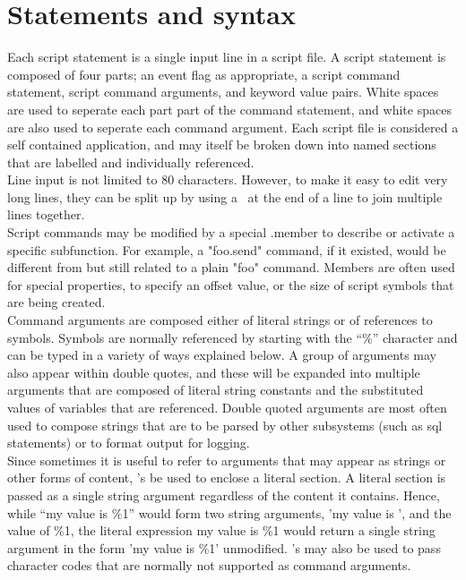 \documentclass[a4paper,12pt]{article}
\begin{document}
\section{Statements and syntax}

Each script statement is a single input line in a script file.  A script
statement is composed of four parts; an event flag as appropriate, a
script command statement, script command arguments, and keyword value
pairs.  White spaces are used to seperate each part part of the command
statement, and white spaces are also used to seperate each command
argument. Each script file is considered a self contained application, 
and may itself be broken down into named sections that are labelled and 
individually referenced. \\

Line input is not limited to 80 characters.  However, to make it easy to 
edit very long lines, they can be split up by using a \ at the end of a 
line to join multiple lines together. \\

Script commands may be modified by a special .member to describe or
activate a specific subfunction.  For example, a "foo.send" command, if it
existed, would be different from but still related to a plain "foo"  
command.  Members are often used for special properties, to specify an
offset value, or the size of script symbols that are being created. \\

Command arguments are composed either of literal strings or of references 
to symbols.  Symbols are normally referenced by starting with the ``\%'' 
character and can be typed in a variety of ways explained below.  A group 
of arguments may also appear within double quotes, and these will be 
expanded into multiple arguments that are composed of literal string 
constants and the substituted values of variables that are referenced.  
Double quoted arguments are most often used to compose strings that are to 
be parsed by other subsystems (such as sql statements) or to format output 
for logging. \\

Since sometimes it is useful to refer to arguments that may appear as 
strings or other forms of content, {}'s be used to enclose a literal 
section.  A literal section is passed as a single string argument 
regardless of the content it contains.  Hence, while ``my value is \%1''
would form two string arguments, 'my value is ', and the value of \%1, the 
literal expression {my value is \%1} would return a single string argument 
in the form 'my value is \%1' unmodified.  {}'s may also be used to pass 
character codes that are normally not supported as command arguments. \\
\end{document}
